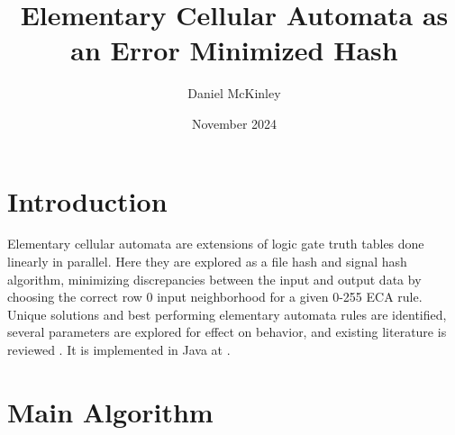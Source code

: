 \documentclass[11pt]{article}
\title{Elementary Cellular Automata as an Error Minimized Hash}
\date{November 2024}
\author{Daniel McKinley}
\begin{document}
\maketitle

\section{Introduction}

Elementary cellular automata are extensions of logic gate truth tables done linearly in parallel. \cite{Wolfram}
Here they are explored as a file hash and signal hash algorithm, minimizing discrepancies between
the input and output data by choosing the correct row 0 input neighborhood for a given 0-255 ECA rule.
Unique solutions and best performing elementary automata rules are identified, several parameters
are explored for effect on behavior, and existing literature is reviewed \cite{hashSchemes}. It is implemented in Java at \cite{mygit}. 
\\
\section{Main Algorithm}
\end{document}
